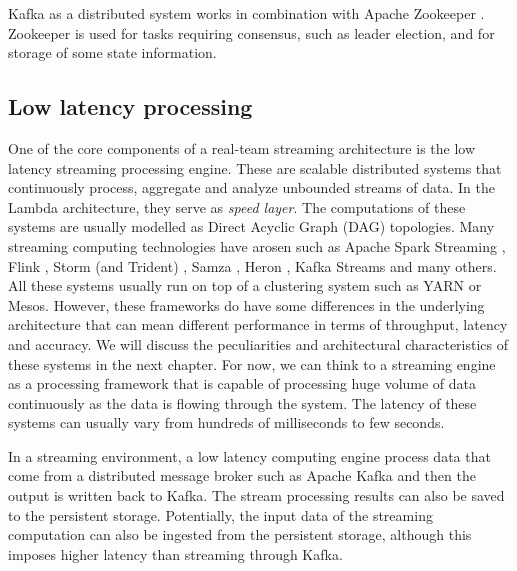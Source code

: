 Kafka as a distributed system works in combination with Apache Zookeeper \cite{apachezookeeperonline}. Zookeeper is used for tasks requiring consensus, such as leader election, and for storage of some state information.




\subsection{Low latency processing}
One of the core components of a real-team streaming architecture is the low latency streaming processing engine. These are scalable distributed systems that continuously process, aggregate and analyze unbounded streams of data. In the Lambda architecture, they serve as \emph{speed layer}. The computations of these systems are usually modelled as Direct Acyclic Graph (DAG) topologies. Many streaming computing technologies have arosen such as Apache Spark Streaming \cite{apachesparkstreamingonline}, Flink \cite{apacheflinkonline}, Storm (and Trident) \cite{apachestormonline}, Samza \cite{apachesamzaonline}, Heron \cite{herononline}, Kafka Streams \cite{kafkastreamsonline} and many others. All these systems usually run on top of a clustering system such as YARN or Mesos. However, these frameworks do have some differences in the underlying architecture that can mean different performance in terms of throughput, latency and accuracy. We will discuss the peculiarities and architectural characteristics of these systems in the next chapter. For now, we can think to a streaming engine as a processing framework that is capable of processing huge volume of data continuously as the data is flowing through the system. The latency of these systems can usually vary from hundreds of milliseconds to few seconds. 

In a streaming environment, a low latency computing engine process data that come from a distributed message broker such as Apache Kafka and then the output is written back to Kafka. The stream processing results can also be saved to the persistent storage. Potentially, the input data of the streaming computation can also be ingested from the persistent storage, although this imposes higher latency than streaming through Kafka.

